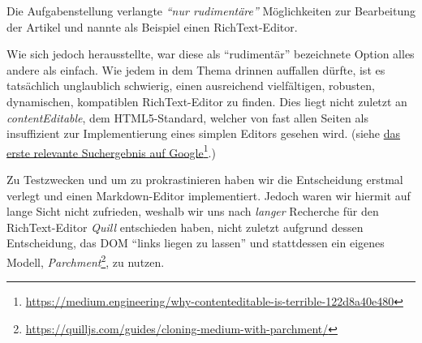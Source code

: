 Die Aufgabenstellung verlangte \emph{``nur rudimentäre''}
Möglichkeiten zur Bearbeitung der Artikel
und nannte als Beispiel einen RichText-Editor.

Wie sich jedoch herausstellte,
war diese als ``rudimentär'' bezeichnete Option
alles andere als einfach.
Wie jedem in dem Thema drinnen auffallen dürfte,
ist es tatsächlich unglaublich schwierig,
einen ausreichend vielfältigen, robusten, dynamischen, kompatiblen
RichText-Editor zu finden.
Dies liegt nicht zuletzt an \emph{contentEditable}, dem HTML5-Standard,
welcher von fast allen Seiten als insuffizient
zur Implementierung eines simplen Editors gesehen wird.
(siehe \href{https://medium.engineering/why-contenteditable-is-terrible-122d8a40e480}%
{das erste relevante Suchergebnis auf Google}\footnote{\url{https://medium.engineering/why-contenteditable-is-terrible-122d8a40e480}}.)

Zu Testzwecken und um zu prokrastinieren haben wir die Entscheidung erstmal verlegt
und einen Markdown-Editor implementiert.
Jedoch waren wir hiermit auf lange Sicht nicht zufrieden,
weshalb wir uns nach \emph{langer} Recherche für den RichText-Editor \emph{Quill} entschieden haben,
nicht zuletzt aufgrund dessen Entscheidung,
das DOM ``links liegen zu lassen'' und stattdessen ein eigenes Modell,
\emph{Parchment}\footnote{\url{https://quilljs.com/guides/cloning-medium-with-parchment/}},
zu nutzen.

